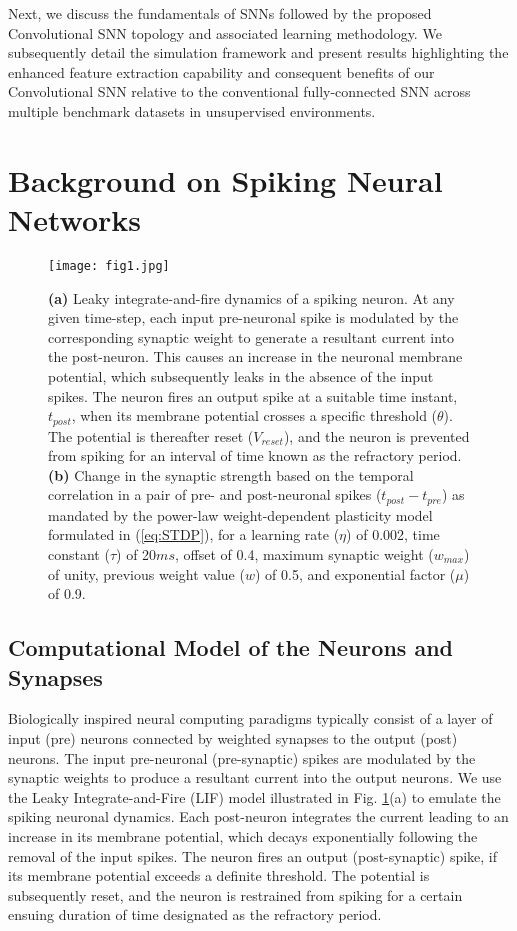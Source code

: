 \documentclass[journal, onecolumn]{IEEEtran}
\begin{document}
Next, we discuss the fundamentals of SNNs followed by the proposed Convolutional SNN topology and associated learning methodology. We subsequently detail the simulation framework and present results highlighting the enhanced feature extraction capability and consequent benefits of our Convolutional SNN relative to the conventional fully-connected SNN across multiple benchmark datasets in unsupervised environments.
\section*{\large\bf{Background on Spiking Neural Networks}}
\begin{figure}[!t]
\centering
\texttt{[image: fig1.jpg]}
\caption{\textbf{(a)} Leaky integrate-and-fire dynamics of a spiking neuron. At any given time-step, each input pre-neuronal spike is modulated by the corresponding synaptic weight to generate a resultant current into the post-neuron. This causes an increase in the neuronal membrane potential, which subsequently leaks in the absence of the input spikes. The neuron fires an output spike at a suitable time instant, $t_{post}$, when its membrane potential crosses a specific threshold ($\theta$). The potential is thereafter reset ($V_{reset}$), and the neuron is prevented from spiking for an interval of time known as the refractory period. \textbf{(b)} Change in the synaptic strength based on the temporal correlation in a pair of pre- and post-neuronal spikes ($t_{post}-t_{pre}$) as mandated by the power-law weight-dependent plasticity model formulated in (\ref{eq:STDP}), for a learning rate ($\eta$) of 0.002, time constant ($\tau$) of 20$ms$, offset of 0.4, maximum synaptic weight ($w_{max}$) of unity, previous weight value ($w$) of 0.5, and exponential factor ($\mu$) of 0.9.}
\label{fig:LIF_Dynamics_STDP}
\end{figure}

\subsection*{\normalsize\bf{Computational Model of the Neurons and Synapses}}
Biologically inspired neural computing paradigms typically consist of a layer of input (pre) neurons connected by weighted synapses to the output (post) neurons. The input pre-neuronal (pre-synaptic) spikes are modulated by the synaptic weights to produce a resultant current into the output neurons. We use the Leaky Integrate-and-Fire (LIF) model \cite{diehl2015unsupervised} illustrated in Fig. \ref{fig:LIF_Dynamics_STDP}(a) to emulate the spiking neuronal dynamics. Each post-neuron integrates the current leading to an increase in its membrane potential, which decays exponentially following the removal of the input spikes. The neuron fires an output (post-synaptic) spike, if its membrane potential exceeds a definite threshold. The potential is subsequently reset, and the neuron is restrained from spiking for a certain ensuing duration of time designated as the refractory period. 
\end{document}
